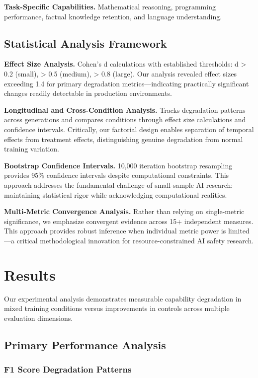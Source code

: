 \documentclass{article}
\begin{document}
\textbf{Task-Specific Capabilities.} Mathematical reasoning, programming performance, factual knowledge retention, and language understanding.

\subsection{Statistical Analysis Framework}

\textbf{Effect Size Analysis.} Cohen's d calculations with established thresholds: d > 0.2 (small), > 0.5 (medium), > 0.8 (large). Our analysis revealed effect sizes exceeding 1.4 for primary degradation metrics—indicating practically significant changes readily detectable in production environments.

\textbf{Longitudinal and Cross-Condition Analysis.} Tracks degradation patterns across generations and compares conditions through effect size calculations and confidence intervals. Critically, our factorial design enables separation of temporal effects from treatment effects, distinguishing genuine degradation from normal training variation.

\textbf{Bootstrap Confidence Intervals.} 10,000 iteration bootstrap resampling provides 95\% confidence intervals despite computational constraints. This approach addresses the fundamental challenge of small-sample AI research: maintaining statistical rigor while acknowledging computational realities.

\textbf{Multi-Metric Convergence Analysis.} Rather than relying on single-metric significance, we emphasize convergent evidence across 15+ independent measures. This approach provides robust inference when individual metric power is limited—a critical methodological innovation for resource-constrained AI safety research.

\section{Results}

Our experimental analysis demonstrates measurable capability degradation in mixed training conditions versus improvements in controls across multiple evaluation dimensions.

\subsection{Primary Performance Analysis}

\subsubsection{F1 Score Degradation Patterns}
\end{document}
